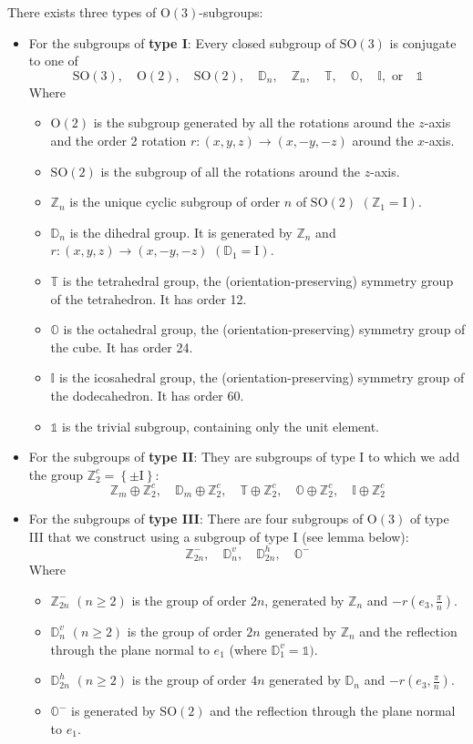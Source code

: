 \documentclass[11pt,a4paper]{amsart}
\theoremstyle{definition}
\newcommand{\ZZ}{\mathbb{Z}}                %
\newcommand{\OO}{\mathrm{O}}                %
\newcommand{\SO}{\mathrm{SO}}               %
\newcommand{\octa}{\mathbb{O}}              %
\newcommand{\ico}{\mathbb{I}}               %
\newcommand{\tetra}{\mathbb{T}}             %
\newcommand{\DD}{\mathbb{D}}                %
\newcommand{\1}{\mathds{1}}		            %
\newcommand{\id}{\mathrm{I}}                %
\newcommand{\set}[1]{\left\{#1\right\}}     %
\begin{document}
There exists three types of $\OO(3)$-subgroups:
\begin{itemize}
\item For the subgroups of \textbf{type I}: Every closed subgroup of $\SO(3)$ is conjugate to one of
\begin{equation*}
\SO(3),\quad \OO(2),\quad \SO(2), \quad \DD_n, \quad \ZZ_n, \quad \tetra, \quad \octa, \quad \ico, \text{ or} \quad \1
\end{equation*}
Where \begin{itemize}
\item $\OO(2)$ is the subgroup generated by all the rotations around the $z$-axis and the
order 2 rotation $r : (x, y,z) \rightarrow (x,-y,-z) $ around the $x$-axis.
\item $\SO(2)$ is the subgroup of all the rotations around the $z$-axis.
\item $\ZZ_n$ is the unique cyclic subgroup of order $n$ of $\SO(2)$ $(\ZZ_1= {\id})$.
\item  $\DD_n$ is the dihedral group. It is generated by $\ZZ_n$ and $r :(x, y,z)\rightarrow (x,-y,-z)$
$(\DD_1 = {\id})$.
\item $\tetra$ is the tetrahedral group, the (orientation-preserving) symmetry group of the
tetrahedron. It has order 12.
\item $\octa$ is the octahedral group, the (orientation-preserving) symmetry group of the
cube. It has order 24.
\item $\ico$ is the icosahedral group, the (orientation-preserving) symmetry group of the
dodecahedron. It has order 60.
\item $\1$ is the trivial subgroup, containing only the unit element.
\end{itemize}
\item For the subgroups of \textbf{type II}: They are subgroups of type I to which we add the group $\ZZ_2^c=\set{\pm \id}$:
\begin{equation*}
\ZZ_m\oplus \ZZ_2^c,\quad \DD_m\oplus \ZZ_2^c,\quad \tetra\oplus \ZZ_2^c,\quad \octa\oplus \ZZ_2^c, \quad \ico\oplus \ZZ_2^c
\end{equation*}
\item For the subgroups of \textbf{type III}: There are four subgroups of $\OO(3)$ of type III that we construct using a subgroup of type I (see lemma below):
\begin{equation*}
\ZZ_{2n}^-,\quad \DD_n^v,\quad \DD_{2n}^h,\quad \octa^-
\end{equation*}
Where \begin{itemize}
\item  $\ZZ_{2n}^-$ $(n \geq 2)$ is the group of order $2n$, generated by $\ZZ_n$ and $-r(e_3,\frac{\pi}{n})$.
\item $\DD_n^v$ $(n\geq2)$ is the group of order $2n$ generated by $\ZZ_n$ and the reflection through the plane normal to $e_1$ (where $\DD_1^v=\1)$.
\item $\DD_{2n}^h$ $(n\geq2)$ is the group of order $4n$ generated by $\DD_n$ and $-r(e_3,\frac{\pi}{n})$.
\item $\octa^-$ is generated by $\SO(2)$ and the reflection through the plane normal to $e_1$.
\end{itemize}
\end{itemize}





\newpage


\end{document}
